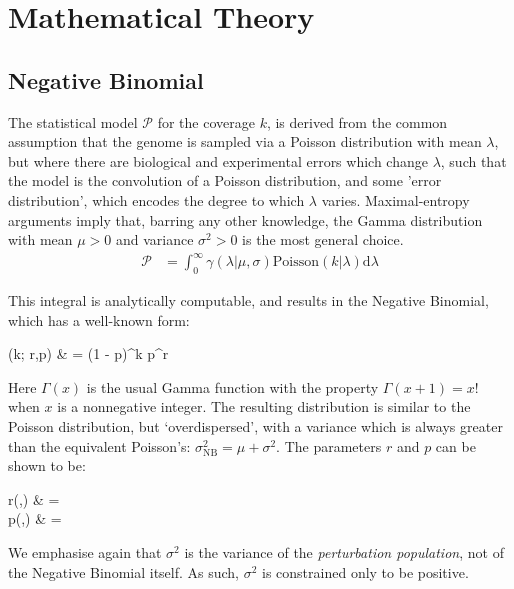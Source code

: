 \documentclass[fleqn,usenatbib]{mnras}
\renewcommand{\d}{\mathrm d}
\begin{document}
								



			
				
			\appendix
			{\small 
			\section{Mathematical Theory}\label{A:Theory}
				\subsection{Negative Binomial}
					The statistical model $\mathcal{P}$ for the coverage $k$, is derived from the common assumption that the genome is sampled via a Poisson distribution with mean $\lambda$, but where there are biological and experimental errors which change $\lambda$, such that the model is the convolution of a Poisson distribution, and some 'error distribution', which encodes the degree to which $\lambda$ varies. Maximal-entropy arguments imply that, barring any other knowledge, the Gamma distribution with mean $\mu > 0$ and variance $\sigma^2 > 0$ is the most general choice. 
					\begin{align}
						\mathcal{P} & = \int_0^\infty \gamma(\lambda| \mu,\sigma) \text{Poisson}(k|\lambda) \d \lambda
					\end{align}

					This integral is analytically computable, and results in the Negative Binomial, which has a well-known form:
					\begin{spalign}
						(k; r,p) & =  (1 - p)^k p^r
					\end{spalign}
					Here $\Gamma(x)$ is the usual Gamma function with the property $\Gamma(x+1) = x!$ when $x$ is a nonnegative integer. The resulting distribution is similar to the Poisson distribution, but `overdispersed', with a variance which is always greater than the equivalent Poisson's: $\sigma_\text{NB}^2 = \mu + \sigma^2$. The parameters $r$ and $p$ can be shown to be:
					\begin{spalign}
						r(\mu,\sigma) & = \frac{\mu^2}{\sigma^2}
						\\
						p(\mu,\sigma) & = \frac{\mu}{\mu + \sigma^2}
					\end{spalign}
					We emphasise again that $\sigma^2$ is the variance of the \textit{perturbation population}, not of the Negative Binomial itself. As such, $\sigma^2$ is constrained only to be positive.

}
\end{document}
